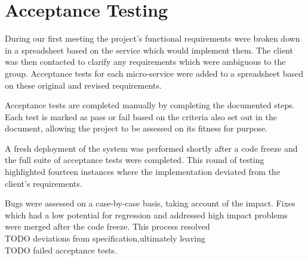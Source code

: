 \section{Acceptance Testing}
\par
During our first meeting the project's functional requirements were broken down in a spreadsheet based on the service which would implement them. The client was then contacted to clarify any requirements which were ambiguous to the group. Acceptance tests for each micro-service were added to a spreadsheet based on these original and revised requirements.

\par
Acceptance tests are completed manually by completing the documented steps. Each test is marked as pass or fail based on the criteria also set out in the document, allowing the project to be assessed on its fitness for purpose.

\par
A fresh deployment of the system was performed shortly after a code freeze and the full suite of acceptance tests were completed. This round of testing highlighted fourteen instances where the implementation deviated from the client's requirements.

\par
Bugs were assessed on a case-by-case basis, taking account of the impact. Fixes which had a low potential for regression and addressed high impact problems were merged after the code freeze. This process resolved \\TODO deviations from specification,ultimately leaving \\TODO failed acceptance tests.